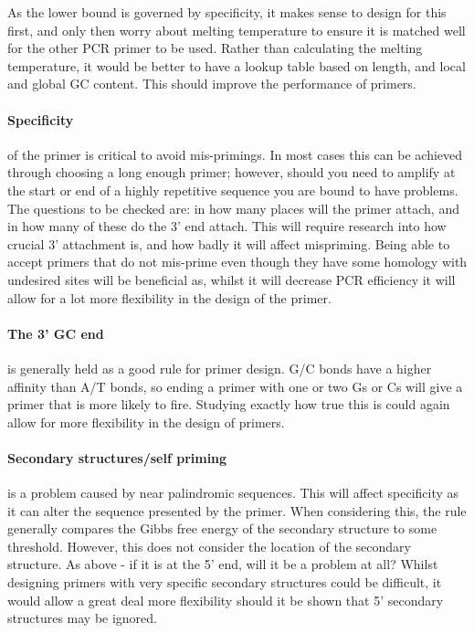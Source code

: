 \documentclass[../main.tex]{subfiles}
\begin{document}
As the lower bound is governed by specificity, it makes sense to design for this first, and only then worry about melting temperature to ensure it is matched well for the other PCR primer to be used. Rather than calculating the melting temperature, it would be better to have a lookup table based on length, and local and global GC content. This should improve the performance of primers.

\paragraph{Specificity} of the primer is critical to avoid mis-primings. In most cases this can be achieved through choosing a long enough primer; however, should you need to amplify at the start or end of a highly repetitive sequence you are bound to have problems. The questions to be checked are: in how many places will the primer attach, and in how many of these do the 3' end attach. This will require research into how crucial 3' attachment is, and how badly it will affect mispriming. Being able to accept primers that do not mis-prime even though they have some homology with undesired sites will be beneficial as, whilst it will decrease PCR efficiency it will allow for a lot more flexibility in the design of the primer.

\paragraph{The 3' GC end} is generally held as a good rule for primer design. G/C bonds have a higher affinity than A/T bonds, so ending a primer with one or two Gs or Cs will give a primer that is more likely to fire. Studying exactly how true this is could again allow for more flexibility in the design of primers.

\paragraph{Secondary structures/self priming} is a problem caused by near palindromic sequences. This will affect specificity as it can alter the sequence presented by the primer. When considering this, the rule generally compares the Gibbs free energy of the secondary structure to some threshold. However, this does not consider the location of the secondary structure. As above - if it is at the 5' end, will it be a problem at all? Whilst designing primers with very specific secondary structures could be difficult, it would allow a great deal more flexibility should it be shown that 5' secondary structures may be ignored.
\end{document}
